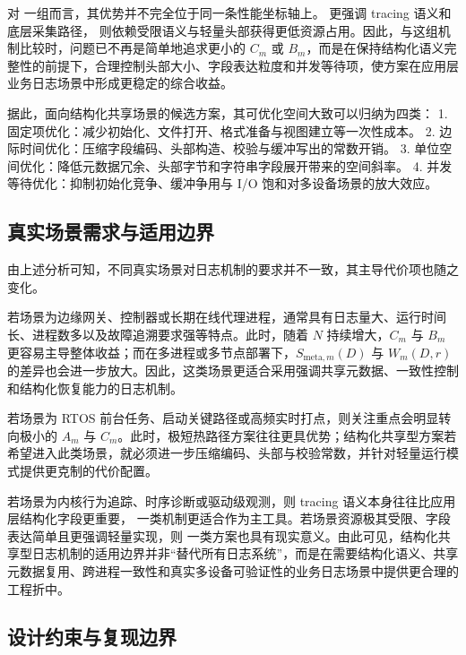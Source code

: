 对  一组而言，其优势并不完全位于同一条性能坐标轴上。 更强调 tracing 语义和底层采集路径， 则依赖受限语义与轻量头部获得更低资源占用。因此，与这组机制比较时，问题已不再是简单地追求更小的 \(C_m\) 或 \(B_m\)，而是在保持结构化语义完整性的前提下，合理控制头部大小、字段表达粒度和并发等待项，使方案在应用层业务日志场景中形成更稳定的综合收益。

据此，面向结构化共享场景的候选方案，其可优化空间大致可以归纳为四类： 1. 固定项优化：减少初始化、文件打开、格式准备与视图建立等一次性成本。 2. 边际时间优化：压缩字段编码、头部构造、校验与缓冲写出的常数开销。 3. 单位空间优化：降低元数据冗余、头部字节和字符串字段展开带来的空间斜率。 4. 并发等待优化：抑制初始化竞争、缓冲争用与 I/O 饱和对多设备场景的放大效应。

\subsection{真实场景需求与适用边界}\label{ux771fux5b9eux573aux666fux9700ux6c42ux4e0eux9002ux7528ux8fb9ux754c}

由上述分析可知，不同真实场景对日志机制的要求并不一致，其主导代价项也随之变化。

若场景为边缘网关、控制器或长期在线代理进程，通常具有日志量大、运行时间长、进程数多以及故障追溯要求强等特点。此时，随着 \(N\) 持续增大，\(C_m\) 与 \(B_m\) 更容易主导整体收益；而在多进程或多节点部署下，\(S_{\text{meta},m}(D)\) 与 \(W_m(D,r)\) 的差异也会进一步放大。因此，这类场景更适合采用强调共享元数据、一致性控制和结构化恢复能力的日志机制。

若场景为 RTOS 前台任务、启动关键路径或高频实时打点，则关注重点会明显转向极小的 \(A_m\) 与 \(C_m\)。此时，极短热路径方案往往更具优势；结构化共享型方案若希望进入此类场景，就必须进一步压缩编码、头部与校验常数，并针对轻量运行模式提供更克制的代价配置。

若场景为内核行为追踪、时序诊断或驱动级观测，则 tracing 语义本身往往比应用层结构化字段更重要， 一类机制更适合作为主工具。若场景资源极其受限、字段表达简单且更强调轻量实现，则  一类方案也具有现实意义。由此可见，结构化共享型日志机制的适用边界并非``替代所有日志系统''，而是在需要结构化语义、共享元数据复用、跨进程一致性和真实多设备可验证性的业务日志场景中提供更合理的工程折中。

\subsection{设计约束与复现边界}\label{ux8bbeux8ba1ux7ea6ux675fux4e0eux590dux73b0ux8fb9ux754c}

